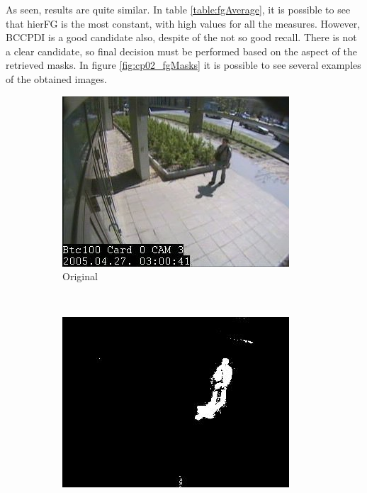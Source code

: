As seen, results are quite similar. In table \ref{table:fgAverage}, it is possible to see that hierFG is the most 
constant, with high values for all the measures. However, BCCPDI is a good candidate also, despite of the not so good 
recall. There is not a clear candidate, so final decision must be performed based on the aspect of the retrieved masks. 
In figure \ref{fig:cp02_fgMasks} it is possible to see several examples of the obtained images.

\begin{figure}[t]
        \centering
        \begin{subfigure}[b]{0.19\textwidth}
                \centering
                \includegraphics[width=\textwidth]{fig13.jpg}
                \caption{Original}
                \label{fig:cp02_originalMask}
        \end{subfigure}%
        ~ %
        \begin{subfigure}[b]{0.19\textwidth}
                \centering
                \includegraphics[width=\textwidth]{fig14.jpg}

\end{subfigure}
\end{figure}
